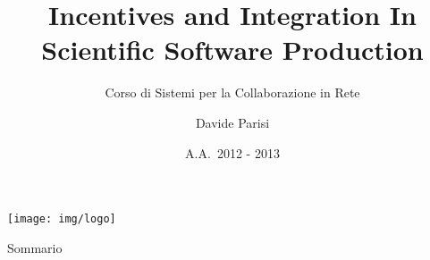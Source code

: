 \documentclass[trans,16pt]{beamer}
\title[CSCW 2013]{Incentives and Integration In Scientific Software Production}
\subtitle[Lettura Critica]{Corso di Sistemi per la Collaborazione in Rete}
\author{Davide Parisi}
\institute[Uniba]
{
	Corso di Laurea in Informatica Magistrale\\Dipartimento di Informatica
}
\date{A.A.~2012 - 2013}
\begin{document}
{
	\begin{frame}
		\centering
		\texttt{[image: img/logo]}
		\maketitle	
	\end{frame}
}
\begin{frame}{Sommario}
	\tableofcontents
\end{frame}



	
\end{document}
